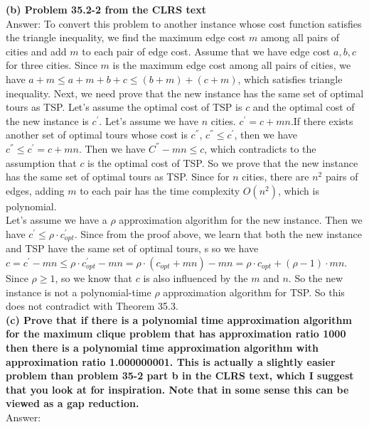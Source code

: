 \documentclass{article}
\begin{document}
\textbf{(b) Problem 35.2-2 from the CLRS text} \\ \newline
Answer: To convert this problem to another instance whose cost function satisfies the triangle inequality, we find the maximum edge cost $m$ among all pairs of cities and add $m$ to each pair of edge cost. Assume that we have edge cost $a, b, c$ for three cities. Since $m$ is the maximum edge cost among all pairs of cities, we have $a + m \leq a + m + b + c \leq (b + m) + (c + m)$, which satisfies triangle inequality. Next, we need prove that the new instance has the same set of optimal tours as TSP. Let's assume the optimal cost of TSP is $c$ and the optimal cost of the new instance is $c^{'}$. Let's assume we have $n$ cities. $c^{'} = c + mn$.If there exists another set of optimal tours whose cost is $c^{''}$, $c^{''}\leq c^{'}$, then we have $c^{''}\leq c^{'} = c + mn$. Then we have $C^{''} - mn \leq c$, which contradicts to the assumption that $c$ is the optimal cost of TSP. So we prove that the new instance has the same set of optimal tours as TSP. Since for $n$ cities, there are $n^2$ pairs of edges, adding $m$ to each pair has the time complexity $O(n^2)$, which is polynomial.\\ \newline
Let's assume we have a $\rho$ approximation algorithm for the new instance. Then we have $c^{'} \leq \rho \cdot c_{opt}^{'}$. Since from the proof above, we learn that both the new instance and TSP have the same set of optimal tours, s so we have $c = c^{'} - mn \leq \rho \cdot c_{opt}^{'} - mn = \rho \cdot (c_{opt} + mn) - mn = \rho \cdot c_{opt} + (\rho - 1)\cdot mn$. Since $\rho \geq 1$, so we know that $c$ is also influenced by the $m$ and $n$. So the new instance is not a polynomial-time $\rho$ approximation algorithm for TSP. So this does not contradict with Theorem 35.3.\\ \newline
\textbf{(c) Prove that if there is a polynomial time approximation algorithm for the maximum clique problem that has approximation ratio 1000 then there is a polynomial time approximation algorithm with approximation ratio 1.000000001. This is actually a slightly easier problem than problem 35-2 part b in the CLRS text, which I suggest that you look at for inspiration. Note that in some sense this can be viewed as a gap reduction.}\\ \newline
Answer: 
\end{document}
